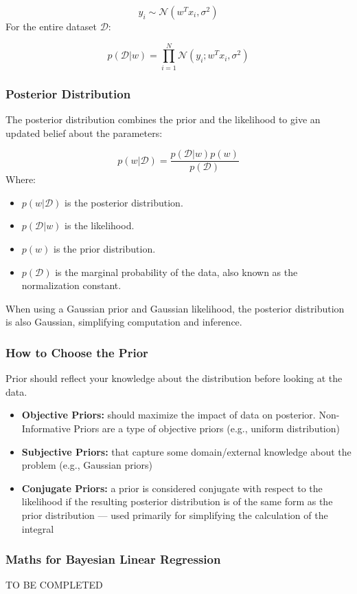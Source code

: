 \documentclass{article}
\begin{document}
\[
y_i \sim \mathcal{N}(w^T x_i, \sigma^2)
\]
For the entire dataset \( \mathcal{D} \):

\[
p(\mathcal{D} | w) = \prod_{i=1}^N \mathcal{N}(y_i; w^T x_i, \sigma^2)
\]

\subsubsection{Posterior Distribution}
The posterior distribution combines the prior and the likelihood to give an updated belief about the parameters:

\[
p(w | \mathcal{D}) = \frac{p(\mathcal{D} | w) p(w)}{p(\mathcal{D})}
\]
Where:
\begin{itemize}
    \item \( p(w | \mathcal{D}) \) is the posterior distribution.
    \item \( p(\mathcal{D} | w) \) is the likelihood.
    \item \( p(w) \) is the prior distribution.
    \item \( p(\mathcal{D}) \) is the marginal probability of the data, also known as the normalization constant.
\end{itemize}
When using a Gaussian prior and Gaussian likelihood, the posterior distribution is also Gaussian, simplifying computation and inference.

\subsubsection{How to Choose the Prior}
Prior should reflect your knowledge about the distribution before looking at the data.
\begin{itemize}
    \item \textbf{Objective Priors: }should maximize the impact of data on posterior. Non-Informative Priors are a type of objective priors (e.g., uniform distribution)
    \item \textbf{Subjective Priors: } that capture some domain/external knowledge about the problem (e.g., Gaussian priors)
    \item \textbf{Conjugate Priors: }a prior is considered conjugate with respect to the likelihood if the resulting posterior distribution is of the same form as the prior distribution — used primarily for simplifying the calculation of the integral
\end{itemize}

\subsubsection{Maths for Bayesian Linear Regression}
TO BE COMPLETED
\end{document}
